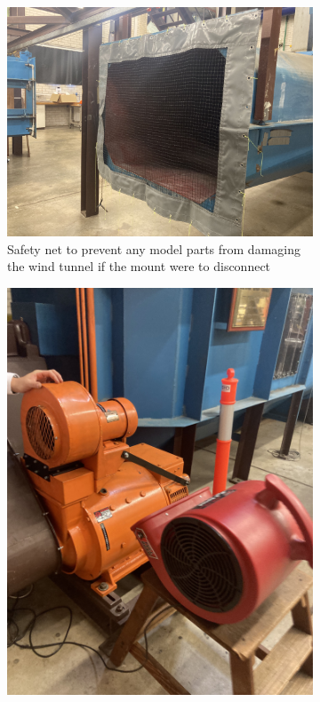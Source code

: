 \begin{figure}[H]
     \centering
     \begin{subfigure}[b]{0.4\textwidth}
             \centering
            \includegraphics[scale =0.04]{04_Methodology/Figs/windTunnelNet.jpg}
            \caption{Safety net to prevent any model parts from damaging the wind tunnel if the mount were to disconnect}
            \label{fig:windTunnelNet}
     \end{subfigure}
     \hfill
     \begin{subfigure}[b]{0.4\textwidth}
                \centering
                \includegraphics[scale=0.04]{04_Methodology/Figs/cooler.jpg}

\end{subfigure}
\end{figure}

